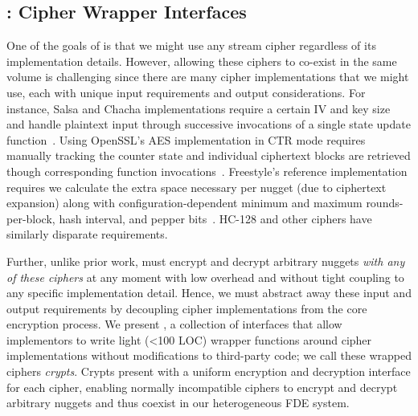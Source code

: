 \subsection{\sysB: Cipher Wrapper Interfaces}\label{subsec:des-crypts}

One of the goals of \sys is that we might use any stream cipher regardless of
its implementation details. However, allowing these ciphers to co-exist in the
same volume is challenging since there are many cipher implementations
that we might use, each with unique input requirements and output
considerations. For instance, Salsa and Chacha implementations require a certain
IV and key size and handle plaintext input through successive invocations of a
single state update function~\cite{Floodyberry}. Using OpenSSL's AES
implementation in CTR mode requires manually tracking the counter state and
individual ciphertext blocks are retrieved though corresponding function
invocations~\cite{OpenSSL}. Freestyle's reference implementation requires we
calculate the extra space necessary per nugget (due to ciphertext expansion)
along with configuration-dependent minimum and maximum rounds-per-block, hash
interval, and pepper bits~\cite{Freestyle}. HC-128 and other ciphers have
similarly disparate requirements.

Further, unlike prior work, \sys must encrypt and decrypt arbitrary
nuggets {\em with any of these ciphers} at any moment with low
overhead and without tight coupling to any specific implementation
detail. Hence, we must abstract away these input and output
requirements by decoupling cipher implementations from the core
encryption process. We present \sysB, a collection of interfaces that
allow implementors to write light (<100 LOC) wrapper functions around
cipher implementations without modifications to third-party code; we
call these wrapped ciphers {\em crypts}. Crypts present \sys with a
uniform encryption and decryption interface for each cipher, enabling
normally incompatible ciphers to encrypt and decrypt arbitrary nuggets
and thus coexist in our heterogeneous FDE system.


